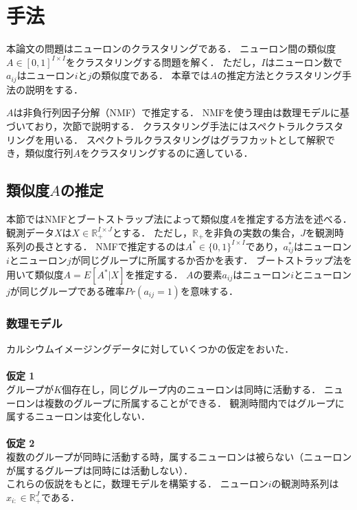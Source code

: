 \chapter{手法}
本論文の問題はニューロンのクラスタリングである．
ニューロン間の類似度$A \in [0, 1]^{I \times I}$をクラスタリングする問題を解く．
ただし，$I$はニューロン数で$a_{ij}$はニューロン$i$と$j$の類似度である．
本章では$A$の推定方法とクラスタリング手法の説明をする．

$A$は非負行列因子分解（NMF）で推定する．
NMFを使う理由は数理モデルに基づいており，次節で説明する．
クラスタリング手法にはスペクトラルクラスタリングを用いる．
スペクトラルクラスタリングはグラフカットとして解釈でき，類似度行列$A$をクラスタリングするのに適している．

\section{類似度$A$の推定}
本節ではNMFとブートストラップ法によって類似度$A$を推定する方法を述べる．
観測データ$X$は$X \in \mathbb{R}_+^{I \times J}$とする．
ただし，$\mathbb{R}_+$を非負の実数の集合，$J$を観測時系列の長さとする．
NMFで推定するのは$A^* \in \{0,1\}^{I \times I}$であり，$a^*_{ij}$はニューロン$i$とニューロン$j$が同じグループに所属するか否かを表す．
ブートストラップ法を用いて類似度$A = E[A^* | X]$を推定する．
$A$の要素$a_{ij}$はニューロン$i$とニューロン$j$が同じグループである確率$Pr(a_{ij} = 1)$を意味する．

\subsection{数理モデル}
カルシウムイメージングデータに対していくつかの仮定をおいた．
\\ \\
\noindent \textbf{仮定 1}\\
グループが$K$個存在し，同じグループ内のニューロンは同時に活動する．
ニューロンは複数のグループに所属することができる．
観測時間内ではグループに属するニューロンは変化しない．
\\ \\
\textbf{仮定 2}\\
複数のグループが同時に活動する時，属するニューロンは被らない（ニューロンが属するグループは同時には活動しない）．
\\

これらの仮説をもとに，数理モデルを構築する．
ニューロン$i$の観測時系列は$x_{i:} \in \mathbb{R}_+^{J}$である．

